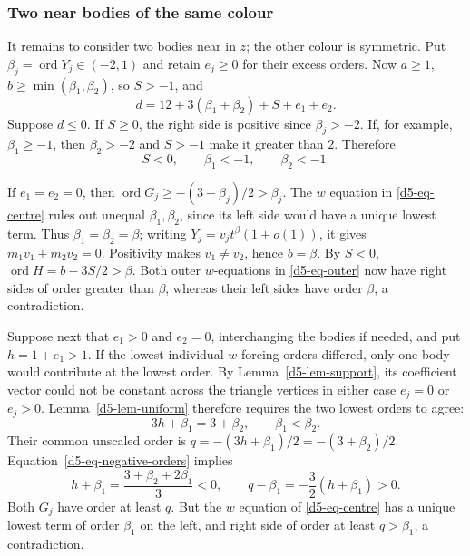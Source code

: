 \documentclass[Threeside,11pt]{article}
\theoremstyle{definition}
\theoremstyle{remark}
\numberwithin{equation}{section}
\theoremstyle{remark}
\newcommand{\ord}{\operatorname{ord}}
\begin{document}
{\subsubsection{Two near bodies of the same colour}\label{d5-same-near}
It remains to consider two bodies near in $z$; the other colour is symmetric.
Put $\beta_j=\ord Y_j\in(-2,1)$ and retain $e_j\ge0$ for their excess
orders.  Now $a\ge1$, $b\ge\min(\beta_1,\beta_2)$, so $S>-1$, and
\begin{equation*}
 d=12+3(\beta_1+\beta_2)+S+e_1+e_2.
\end{equation*}
Suppose $d\le0$.  If $S\ge0$, the right side is positive since $\beta_j>-2$.
If, for example, $\beta_1\ge-1$, then $\beta_2>-2$ and $S>-1$ make it greater
than $2$.  Therefore
\begin{equation}\label{d5-eq-negative-orders}
 S<0,\qquad \beta_1<-1,\qquad \beta_2<-1.
\end{equation}

If $e_1=e_2=0$, then $\ord G_j\ge-(3+\beta_j)/2>\beta_j$.
The $w$ equation in \eqref{d5-eq-centre} rules out unequal $\beta_1,\beta_2$,
since its left side would have a unique lowest term.  Thus
$\beta_1=\beta_2=\beta$; writing $Y_j=v_jt^\beta(1+o(1))$, it gives
$m_1v_1+m_2v_2=0$.  Positivity makes $v_1\ne v_2$, hence $b=\beta$.
By $S<0$, $\ord H=b-3S/2>\beta$.  Both outer $w$-equations in
\eqref{d5-eq-outer} now have right sides of order greater than $\beta$, whereas
their left sides have order $\beta$, a contradiction.

Suppose next that $e_1>0$ and $e_2=0$, interchanging the bodies if needed,
and put $h=1+e_1>1$.  If the lowest individual $w$-forcing orders differed, only
one body would contribute at the lowest order.  By
Lemma~\ref{d5-lem-support}, its coefficient vector could not be constant
across the triangle vertices in either case $e_j=0$ or $e_j>0$.
Lemma~\ref{d5-lem-uniform} therefore requires the two lowest orders to agree:
\[
 3h+\beta_1=3+\beta_2,\qquad \beta_1<\beta_2.
\]
Their common unscaled order is $q=-(3h+\beta_1)/2=-(3+\beta_2)/2$.
Equation~\eqref{d5-eq-negative-orders} implies
\[
 h+\beta_1=\frac{3+\beta_2+2\beta_1}{3}<0,\qquad
 q-\beta_1=-\frac32(h+\beta_1)>0.
\]
Both $G_j$ have order at least $q$.  But the $w$ equation of
\eqref{d5-eq-centre} has a unique lowest term of order $\beta_1$ on the left,
and right side of order at least $q>\beta_1$, a contradiction.

}
\end{document}
